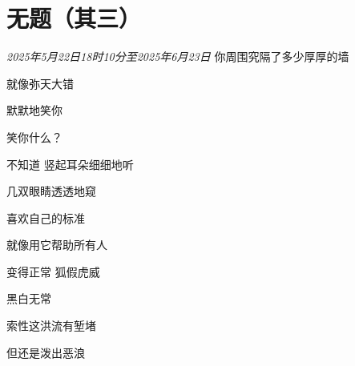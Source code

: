 \section*{无题（其三）}
\begin{center}
\textit{2025年5月22日18时10分至2025年6月23日}\hh 
你周围究隔了多少厚厚的墙

就像弥天大错

默默地笑你

笑你什么？

不知道\hh
竖起耳朵细细地听

几双眼睛透透地窥

喜欢自己的标准

就像用它帮助所有人

变得正常\hh
狐假虎威

黑白无常

索性这洪流有堑堵

但还是泼出恶浪
\end{center}